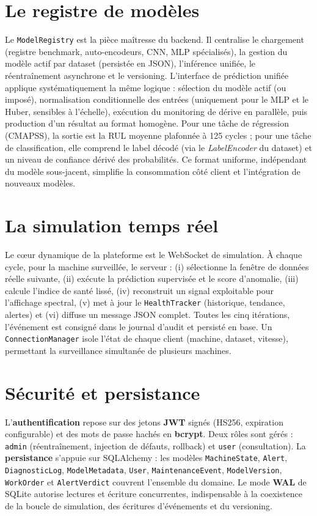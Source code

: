 \section{Le registre de modèles}
Le \texttt{ModelRegistry} est la pièce maîtresse du backend. Il centralise le chargement
(registre benchmark, auto-encodeurs, CNN, MLP spécialisés), la gestion du modèle actif par
dataset (persistée en JSON), l'inférence unifiée, le réentraînement asynchrone et le
versioning. L'interface de prédiction unifiée applique systématiquement la même logique :
sélection du modèle actif (ou imposé), normalisation conditionnelle des entrées (uniquement
pour le MLP et le Huber, sensibles à l'échelle), exécution du monitoring de dérive en
parallèle, puis production d'un résultat au format homogène. Pour une tâche de régression
(CMAPSS), la sortie est la RUL moyenne plafonnée à 125 cycles ; pour une tâche de
classification, elle comprend le label décodé (via le \emph{LabelEncoder} du dataset) et un
niveau de confiance dérivé des probabilités. Ce format uniforme, indépendant du modèle
sous-jacent, simplifie la consommation côté client et l'intégration de nouveaux modèles.

\section{La simulation temps réel}
Le c\oe ur dynamique de la plateforme est le WebSocket de simulation. À chaque cycle, pour
la machine surveillée, le serveur : (i) sélectionne la fenêtre de données réelle suivante,
(ii) exécute la prédiction supervisée et le score d'anomalie, (iii) calcule l'indice de
santé lissé, (iv) reconstruit un signal exploitable pour l'affichage spectral, (v) met à
jour le \texttt{HealthTracker} (historique, tendance, alertes) et (vi) diffuse un message
JSON complet. Toutes les cinq itérations, l'événement est consigné dans le journal d'audit
et persisté en base. Un \texttt{ConnectionManager} isole l'état de chaque client (machine,
dataset, vitesse), permettant la surveillance simultanée de plusieurs machines.

\section{Sécurité et persistance}
L'\textbf{authentification} repose sur des jetons \textbf{JWT} signés (HS256, expiration
configurable) et des mots de passe hachés en \textbf{bcrypt}. Deux rôles sont gérés :
\texttt{admin} (réentraînement, injection de défauts, rollback) et \texttt{user}
(consultation). La \textbf{persistance} s'appuie sur SQLAlchemy : les modèles
\texttt{MachineState}, \texttt{Alert}, \texttt{DiagnosticLog}, \texttt{ModelMetadata},
\texttt{User}, \texttt{MaintenanceEvent}, \texttt{ModelVersion}, \texttt{WorkOrder} et
\texttt{AlertVerdict} couvrent l'ensemble du domaine. Le mode \textbf{WAL} de SQLite autorise
lectures et écriture concurrentes, indispensable à la coexistence de la boucle de simulation,
des écritures d'événements et du versioning.

